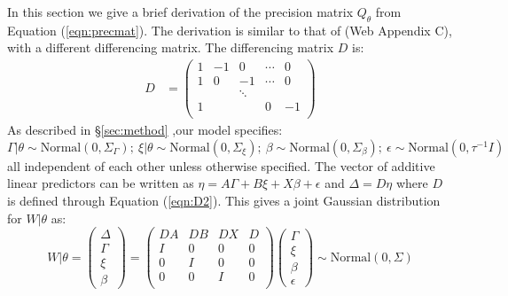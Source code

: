 \documentclass[num-refs,serif,10pt]{wiley-article}
\begin{document}
In this section we give a brief derivation of the precision matrix $Q_{\theta}$ from Equation (\ref{eqn:precmat}). The derivation is similar to that of \cite{casecross} (Web Appendix C), with a different differencing matrix. The differencing matrix $D$ is:
\begin{equation}\begin{aligned}\label{eqn:D2}
D &= \begin{pmatrix}
1 & -1 & 0 & \cdots & 0 \\
1 & 0 & -1 & \cdots & 0 \\
  &    & \ddots &   &   \\
1 &    &       & 0 & -1 \\
\end{pmatrix}
\end{aligned}\end{equation}
As described in \S\ref{sec:method} ,our model specifies:
\begin{equation*}
\Gamma|\theta \sim \text{Normal}\left( 0,\Sigma_{\Gamma}\right); \ \xi|\theta \sim \text{Normal}\left( 0,\Sigma_{\xi}\right); \ \beta \sim \text{Normal}\left( 0,\Sigma_{\beta}\right); \ \epsilon \sim \text{Normal}\left( 0,\tau^{-1}I\right)
\end{equation*}
all independent of each other unless otherwise specified. The vector of additive linear predictors can be written as $\eta = A\Gamma + B\xi + X\beta + \epsilon$ and $\Delta = D\eta$ where $D$ is defined through Equation (\ref{eqn:D2}). This gives a joint Gaussian distribution for $W|\theta$ as:
\begin{equation*}
W|\theta = \begin{pmatrix} \Delta \\ \Gamma \\ \xi \\\beta \end{pmatrix} = \begin{pmatrix} DA & DB & DX & D \\ I & 0 & 0 & 0 \\ 0 & I & 0 & 0 \\ 0 & 0 & I & 0 \\ \end{pmatrix}\begin{pmatrix}\Gamma\\ \xi \\ \beta \\ \epsilon \end{pmatrix} 
\sim \text{Normal}\left( 0,\Sigma\right)
\end{equation*}
\end{document}
